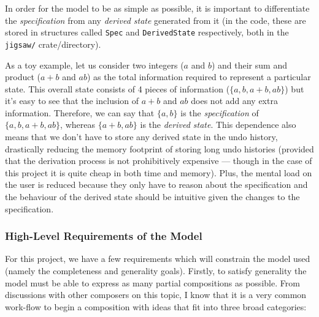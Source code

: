 \documentclass[12pt]{article}
\begin{document}
In order for the model to be as simple as possible, it is important to differentiate the
\emph{specification} from any \emph{derived state} generated from it (in the code, these are stored
in structures called \verb|Spec| and \verb|DerivedState| respectively, both in the \verb|jigsaw/|
crate/directory).

As a toy example, let us consider two integers ($a$ and $b$) and their sum and product ($a + b$ and
$ab$) as the total information required to represent a particular state.  This overall state
consists of 4 pieces of information ($\{a, b, a + b, ab\}$) but it's easy to see that the inclusion
of $a + b$ and $ab$ does not add any extra information.  Therefore, we can say that $\{a, b\}$ is
the \emph{specification} of $\{a, b, a + b, ab\}$, whereas $\{a + b, ab\}$ is the \emph{derived
state}.  This dependence also means that we don't have to store any derived state in the undo
history, drastically reducing the memory footprint of storing long undo histories (provided that the
derivation process is not prohibitively expensive --- though in the case of this project it is quite
cheap in both time and memory).  Plus, the mental load on the user is reduced because they only have
to reason about the specification and the behaviour of the derived state should be intuitive given
the changes to the specification.

\subsubsection{High-Level Requirements of the Model}

For this project, we have a few requirements which will constrain the model used (namely the
completeness and generality goals).  Firstly, to satisfy generality the model must be able to
express as many partial compositions as possible.  From discussions with other composers on this
topic, I know that it is a very common work-flow to begin a composition with ideas that fit into
three broad categories:
\end{document}
